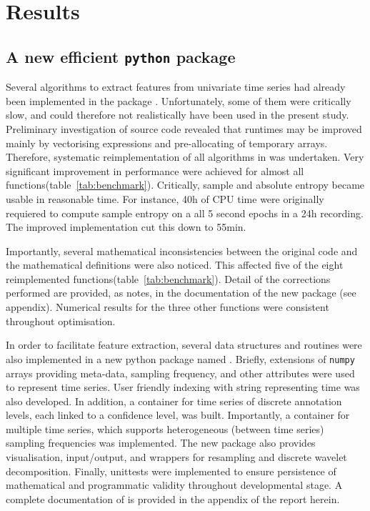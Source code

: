 
\section{Results} \label{results}

\subsection{A new efficient \texttt{python} package}
Several algorithms to extract features from univariate time series had already been implemented in the \py{} package \pyeeg{}\citationneeded{}.
Unfortunately, some of them were critically slow, and could therefore not realistically have been used in the present study.
Preliminary investigation of \pyeeg{} source code revealed that runtimes may be improved mainly by vectorising expressions and pre-allocating of temporary arrays.
Therefore, systematic reimplementation of all algorithms in \pyeeg{} was undertaken.
Very significant improvement in performance were achieved for almost all functions(table~\ref{tab:benchmark}).
Critically, sample \citationneeded{} and absolute \citationneeded{} entropy became usable in reasonable time.
For instance, 40h of CPU time were originally  requiered to compute sample entropy on a all 5 second epochs in a 24h recording.
The improved implementation cut this down to 55min.


Importantly, several mathematical inconsistencies between the original code and the mathematical definitions were also noticed.
This affected five of the eight reimplemented functions(table~\ref{tab:benchmark}).
Detail of the corrections performed are provided, as notes, in the documentation of the new package (see appendix).
Numerical results for the three other functions were consistent throughout optimisation.

In order to facilitate feature extraction, several data structures and routines were also implemented
in a new python package named \pr{}.
Briefly, extensions of \texttt{numpy} arrays providing meta-data, sampling frequency, and other attributes were used to represent time series.
User friendly indexing with string representing time was also developed.
In addition, a container for time series of discrete annotation levels, each linked to a confidence level, was built.
Importantly, a container for multiple time series, which supports heterogeneous (between time series) sampling frequencies was implemented.
The new package also provides visualisation, input/output, and wrappers for resampling and discrete wavelet decomposition.
Finally, unittests were implemented to ensure persistence of mathematical and programmatic validity throughout developmental stage.
A complete documentation of \pr{} is provided in the appendix of the report herein.

